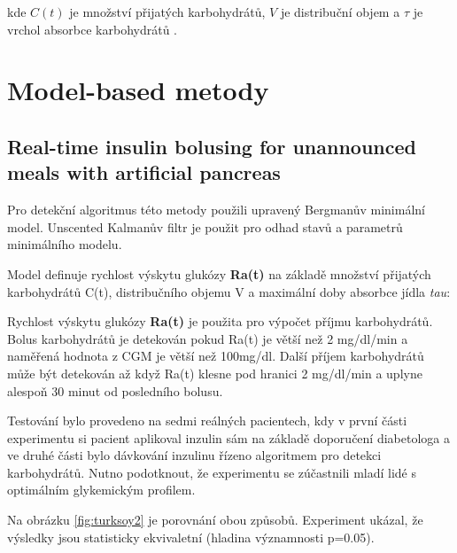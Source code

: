 
\noindent kde $C(t)$ je množství přijatých karbohydrátů, $V$  je distribuční objem a $\tau$ je vrchol absorbce karbohydrátů \citep{Analyza.Turksoy}.


\section{Model-based metody}
\subsection{Real-time insulin bolusing for unannounced meals with artificial pancreas}
\label{ch:turksoy}

Pro detekční algoritmus této metody použili \citet{Analyza.Turksoy} upravený Bergmanův minimální model. Unscented Kalmanův filtr je použit pro odhad stavů a parametrů minimálního modelu.

Model definuje rychlost výskytu glukózy \textbf{Ra(t)} na základě množství přijatých karbohydrátů C(t), distribučního objemu V a maximální doby absorbce jídla \textit{tau}:


Rychlost výskytu glukózy \textbf{Ra(t)} je použita pro výpočet příjmu karbohydrátů. Bolus karbohydrátů je detekován pokud Ra(t) je větší než 2 mg/dl/min a naměřená hodnota z CGM je větší než 100mg/dl. Další příjem karbohydrátů může být detekován až když Ra(t) klesne pod hranici 2 mg/dl/min a uplyne alespoň 30 minut od posledního bolusu.

Testování bylo provedeno na sedmi reálných pacientech, kdy v první části experimentu si pacient aplikoval inzulin sám na základě doporučení diabetologa a ve druhé části bylo dávkování inzulinu řízeno algoritmem pro detekci karbohydrátů. Nutno podotknout, že experimentu se zúčastnili mladí lidé s optimálním glykemickým profilem.

Na obrázku \ref{fig:turksoy2} je porovnání obou způsobů. Experiment ukázal, že výsledky jsou statisticky ekvivaletní (hladina významnosti p=0.05).

